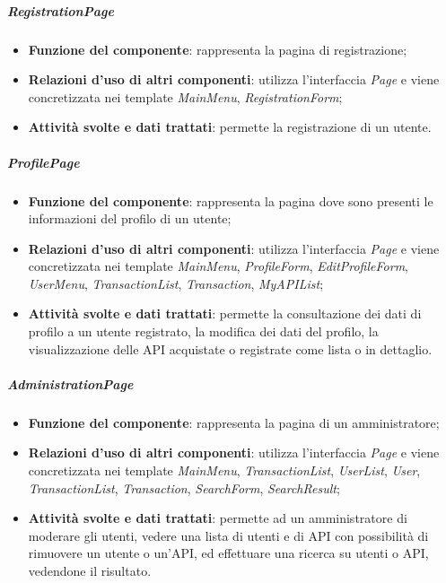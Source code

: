 \subparagraph{RegistrationPage}
\begin{itemize}
	\item \textbf{Funzione del componente}: rappresenta la pagina di registrazione;
	\item \textbf{Relazioni d'uso di altri componenti}: utilizza l'interfaccia \textit{Page} e viene concretizzata nei template \textit{MainMenu}, \textit{RegistrationForm};
	\item \textbf{Attività svolte e dati trattati}: permette la registrazione di un utente.
\end{itemize}

\subparagraph{ProfilePage}
\begin{itemize}
	\item \textbf{Funzione del componente}: rappresenta la pagina dove sono presenti le informazioni del profilo di un utente;
	\item \textbf{Relazioni d'uso di altri componenti}: utilizza l'interfaccia \textit{Page} e viene concretizzata nei template \textit{MainMenu}, \textit{ProfileForm}, \textit{EditProfileForm}, \textit{UserMenu}, \textit{TransactionList}, \textit{Transaction}, \textit{MyAPIList};
	\item \textbf{Attività svolte e dati trattati}: permette la consultazione dei dati di profilo a un utente registrato, la modifica dei dati del profilo, la visualizzazione delle API acquistate o registrate come lista o in dettaglio.
\end{itemize}

\subparagraph{AdministrationPage}
\begin{itemize}
	\item \textbf{Funzione del componente}: rappresenta la pagina di un amministratore;
	\item \textbf{Relazioni d'uso di altri componenti}: utilizza l'interfaccia \textit{Page} e viene concretizzata nei template \textit{MainMenu}, \textit{TransactionList}, \textit{UserList}, \textit{User}, \textit{TransactionList}, \textit{Transaction}, \textit{SearchForm}, \textit{SearchResult};
	\item \textbf{Attività svolte e dati trattati}: permette ad un amministratore di moderare gli utenti, vedere una lista di utenti e di API con possibilità di rimuovere un utente o un'API, ed effettuare una ricerca su utenti o API, vedendone il risultato.
\end{itemize}

